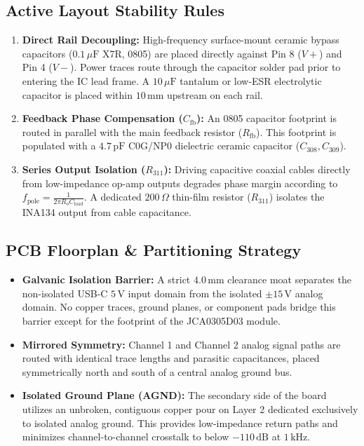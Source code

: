 \documentclass[11pt, letterpaper]{article}
\begin{document}
\subsection{Active Layout Stability Rules}
\begin{enumerate}[label=\textbf{\alph*.}]
    \item \textbf{Direct Rail Decoupling:} High-frequency surface-mount ceramic bypass capacitors ($0.1\,\mu\text{F}$ X7R, 0805) are placed directly against Pin 8 ($V+$) and Pin 4 ($V-$). Power traces route through the capacitor solder pad prior to entering the IC lead frame. A $10\,\mu\text{F}$ tantalum or low-ESR electrolytic capacitor is placed within $10\,\text{mm}$ upstream on each rail.
    \item \textbf{Feedback Phase Compensation ($C_{\text{fb}}$):} An 0805 capacitor footprint is routed in parallel with the main feedback resistor ($R_{\text{fb}}$). This footprint is populated with a $4.7\,\text{pF}$ C0G/NP0 dielectric ceramic capacitor ($C_{308}, C_{309}$).
    \item \textbf{Series Output Isolation ($R_{311}$):} Driving capacitive coaxial cables directly from low-impedance op-amp outputs degrades phase margin according to $f_{\text{pole}} = \frac{1}{2 \pi R_o C_{\text{load}}}$. A dedicated $200\,\Omega$ thin-film resistor ($R_{311}$) isolates the INA134 output from cable capacitance.
\end{enumerate}

\subsection{PCB Floorplan \& Partitioning Strategy}
\begin{itemize}[leftmargin=1.5em]
    \item \textbf{Galvanic Isolation Barrier:} A strict $4.0\,\text{mm}$ clearance moat separates the non-isolated USB-C $5\,\text{V}$ input domain from the isolated $\pm 15\,\text{V}$ analog domain. No copper traces, ground planes, or component pads bridge this barrier except for the footprint of the JCA0305D03 module.
    \item \textbf{Mirrored Symmetry:} Channel 1 and Channel 2 analog signal paths are routed with identical trace lengths and parasitic capacitances, placed symmetrically north and south of a central analog ground bus.
    \item \textbf{Isolated Ground Plane (AGND):} The secondary side of the board utilizes an unbroken, contiguous copper pour on Layer 2 dedicated exclusively to isolated analog ground. This provides low-impedance return paths and minimizes channel-to-channel crosstalk to below $-110\,\text{dB}$ at $1\,\text{kHz}$.
\end{itemize}
\end{document}
